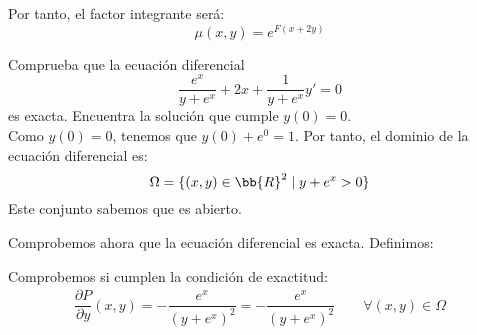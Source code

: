 \documentclass[12pt]{article}
\begin{document}
\begin{ejercicio}
        Por tanto, el factor integrante será:
        \begin{equation*}
            \mu(x, y) = e^{F(x + 2y)}
        \end{equation*}
    \end{ejercicio}

    \begin{ejercicio}
        Comprueba que la ecuación diferencial
        \begin{equation*}
            \dfrac{e^x}{y+e^x} +2x+\dfrac{1}{y + e^x}y' = 0
        \end{equation*}
        es exacta. Encuentra la solución que cumple $y(0) = 0$.\\

        Como $y(0)=0$, tenemos que $y(0)+e^0=1$. Por tanto, el dominio de la ecuación diferencial es:
        \begin{equation*}
            \Omega=\{(x,y)\in\bb{R}^2\mid y+e^x > 0\}
        \end{equation*}
        Este conjunto sabemos que es abierto.
        \begin{comment}
        Para ver que es conexo, veremos que es estrellado desde el origen. Sea $(x,y)\in\Omega$, entonces $y+e^x>0$. Tenemos que:
        \begin{multline*}
            [(0,0),(x,y)]=\{(1-t)(0,0)+t(x,y)\mid t\in[0,1]\}=\{(tx,ty)\mid t\in[0,1]\}\subset \Omega
            \Longleftrightarrow
            \\ \Longleftrightarrow
             ty+e^{tx}>0 \Longleftrightarrow t(y+e^x)>0 \qquad \forall t\in[0,1]
        \end{multline*}
        que es cierto por hipótesis. Por tanto, ese dominio es válido.
        \end{comment}
        Comprobemos ahora que la ecuación diferencial es exacta.
        Definimos:

        Comprobemos si cumplen la condición de exactitud:
        \begin{align*}
            \dfrac{\partial P}{\partial y}(x,y) = -\dfrac{e^x}{(y+e^x)^2} = -\dfrac{e^x}{(y+e^x)^2}\qquad \forall (x,y)\in\Omega\\
        \end{align*}


\end{ejercicio}
\end{document}
